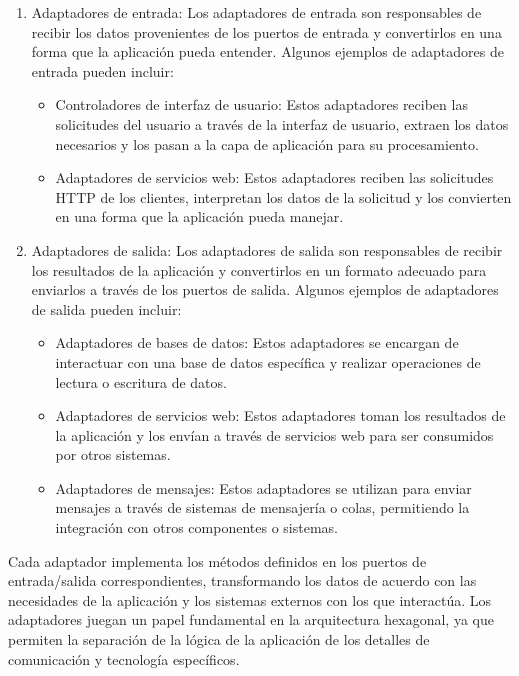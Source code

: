 \documentclass[executivepaper]{article}
\begin{document}
\begin{enumerate}
    \item Adaptadores de entrada:
    Los adaptadores de entrada son responsables de recibir los datos provenientes de los puertos de entrada y convertirlos en una forma que la aplicación pueda entender. Algunos ejemplos de adaptadores de entrada pueden incluir:
   \begin{itemize}
        \item Controladores de interfaz de usuario: Estos adaptadores reciben las solicitudes del usuario a través de la interfaz de usuario, extraen los datos necesarios y los pasan a la capa de aplicación para su procesamiento.
        \item Adaptadores de servicios web: Estos adaptadores reciben las solicitudes HTTP de los clientes, interpretan los datos de la solicitud y los convierten en una forma que la aplicación pueda manejar.
    \end{itemize}
    \item Adaptadores de salida:
    Los adaptadores de salida son responsables de recibir los resultados de la aplicación y convertirlos en un formato adecuado para enviarlos a través de los puertos de salida. Algunos ejemplos de adaptadores de salida pueden incluir:
   \begin{itemize}
        \item Adaptadores de bases de datos: Estos adaptadores se encargan de interactuar con una base de datos específica y realizar operaciones de lectura o escritura de datos.
        \item Adaptadores de servicios web: Estos adaptadores toman los resultados de la aplicación y los envían a través de servicios web para ser consumidos por otros sistemas.
        \item Adaptadores de mensajes: Estos adaptadores se utilizan para enviar mensajes a través de sistemas de mensajería o colas, permitiendo la integración con otros componentes o sistemas.
    \end{itemize}
\end{enumerate}
Cada adaptador implementa los métodos definidos en los puertos de entrada/salida correspondientes, transformando los datos de acuerdo con las necesidades de la aplicación y los sistemas externos con los que interactúa. Los adaptadores juegan un papel fundamental en la arquitectura hexagonal, ya que permiten la separación de la lógica de la aplicación de los detalles de comunicación y tecnología específicos.
\end{document}
